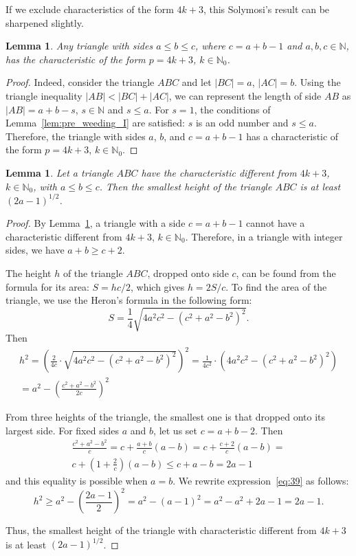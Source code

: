 \documentclass[a4paper,14pt]{article} %
\theoremstyle{plain}
\newtheorem{lemma}[theorem]{Lemma}
\theoremstyle{definition}
\begin{document}
If we exclude characteristics of the form $4k+3$, this Solymosi's result can be sharpened slightly.

\begin{lemma}
	\label{lem:triangle_4k_plus_3}
	Any triangle with sides $a \leq b \leq c$, where $c=a+b-1$ and $a, b, c \in \mathbb{N}$,
	has the characteristic of the form $p=4k+3$, $k\in \mathbb{N}_0$.
\end{lemma}

\begin{proof}
	Indeed, consider the triangle $ABC$ and let $|BC|=a$, $|AC|=b$.
	Using the triangle inequality $|AB| < |BC|+|AC|$,
	we can represent the length of side $AB$ as $|AB|=a+b-s$, $s \in \mathbb{N}$ and $s \leq a$.
	For $s=1$, the conditions of Lemma~\ref{lem:pre_weeding_I} are satisfied: $s$ is an odd number and $s \leq a$.
	Therefore, the triangle with sides $a$, $b$, and $c=a+b-1$
	has a characteristic of the form $p=4k+3$, $k\in \mathbb{N}_0$.
\end{proof}


\begin{lemma}
	\label{lem:triangle_height_our}
	Let a triangle $ABC$ have the characteristic different from $4k+3$, $k\in \mathbb{N}_0$, with $a\leq b\leq c$. Then the smallest height of the triangle $ABC$ is at least $(2a-1)^{1/2}$.
\end{lemma}

\begin{proof}
	By Lemma~\ref{lem:triangle_4k_plus_3}, a triangle with a side $c=a+b-1$ cannot have a characteristic different from $4k+3$, $k\in \mathbb{N}_0$. Therefore, in a triangle with integer sides, we have $a+b\geq c+2.$

	The height $h$ of the triangle $ABC$, dropped onto side $c$, can be found from the formula for its area: $S=hc/2$, which gives $h=2S/c$. To find the area of the triangle, we use the Heron's formula in the following form:
	$$
	S=\frac{1}{4} \sqrt{4a^2c^2-(c^2+a^2-b^2)^2}.
	$$
	Then
	\begin{multline}
		\label{eq:39}
		h^2=\left( \frac{2}{4c} \cdot \sqrt{4a^2c^2-(c^2+a^2-b^2)^2}\right)^2
		=
		\frac{1}{4c^2} \cdot \left( 4a^2c^2-(c^2+a^2-b^2)^2 \right)
		\\
		=
		a^2- \left(\frac{c^2+a^2-b^2}{2c} \right)^2
	\end{multline}

	From three heights of the triangle, the smallest one is that dropped onto its largest side.
	For fixed sides $a$ and $b$, let us set $c=a+b-2$. Then
	\begin{multline}
		\label{eq: 40}
		\frac{c^2+a^2-b^2}{c}
		=
		c+\frac{a+b}{c}(a-b) = c+\frac{c+2}{c}(a-b)
		=
		\\
		c+\left(1+\frac{2}{c}\right)(a-b) \leq c+a-b=2a-1
	\end{multline}
	and this equality is possible when $a=b$. We rewrite expression~\eqref{eq:39} as follows:
	$$
	h^2 \geq a^2- \left(\frac{2a-1}{2} \right)^2=a^2-(a-1)^2=a^2-a^2+2a-1=2a-1.
	$$

	Thus, the smallest height of the triangle with characteristic different from $4k+3$ is at least $(2a-1)^{1/2}$.
\end{proof}
\end{document}
